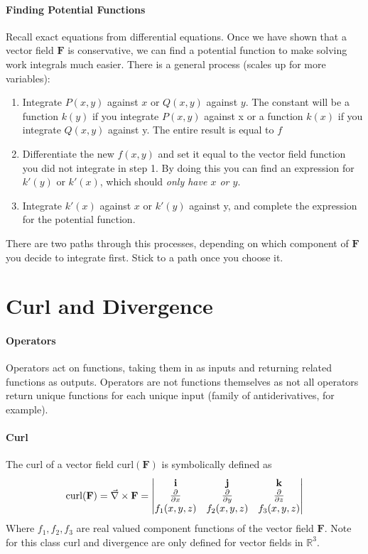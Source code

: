 \documentclass{article}
\begin{document}
\paragraph{Finding Potential Functions} Recall exact equations from differential equations. Once we have shown that a vector field $\mathbf{F}$ is conservative, we can find a potential function to make solving work integrals much easier. There is a general process (scales up for more variables):
\begin{enumerate}
    \item Integrate $P(x,y)$ against $x$ or $Q(x,y)$ against $y$. The constant will be a function $k(y)$ if you integrate $P(x,y)$ against x or a function $k(x)$ if you integrate $Q(x,y)$ against y. The entire result is equal to $f$
    \item Differentiate the new $f(x,y)$ and set it equal to the vector field function you did not integrate in step 1. By doing this you can find an expression for $k'(y)$ or $k'(x)$, which should \textit{only have $x$ or $y$}.
    \item Integrate $k'(x)$ against $x$ or $k'(y)$ against y, and complete the expression for the potential function.
\end{enumerate}
There are two paths through this processes, depending on which component of $\mathbf{F}$ you decide to integrate first. Stick to a path once you choose it.

\section*{Curl and Divergence}
\paragraph{Operators} Operators act on functions, taking them in as inputs and returning related functions as outputs. Operators are not functions themselves as not all operators return unique functions for each unique input (family of antiderivatives, for example). 

\paragraph{Curl} The curl of a vector field $\mathrm{curl}(\mathbf{F})$ is symbolically defined as 
\[ 
    \mathrm{curl}(\mathbf{F}) = \Vec{\nabla} \times \mathbf{F} =
    \begin{vmatrix}
        \mathbf{i} & \mathbf{j} & \mathbf{k} \\
        \frac{\partial }{\partial x} & \frac{\partial }{\partial y} & \frac{\partial }{\partial z} \\
        f_1(x,y,z) & f_2(x,y,z) & f_3(x,y,z)
    \end{vmatrix}
\]
Where $f_1, f_2, f_3$ are real valued component functions of the vector field $\mathbf{F}$. Note for this class curl and divergence are only defined for vector fields in $\mathbb{R}^3$.
\end{document}
